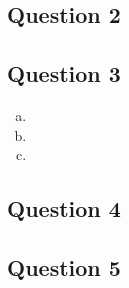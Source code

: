 \documentclass{article}
\begin{document}

\subsection*{Question 2}


\subsection*{Question 3}

\begin{enumerate}[(a)]
	\item 
	
	\item 
	
	\item 
	
\end{enumerate}


\subsection*{Question 4}



\subsection*{Question 5}



\end{document}
